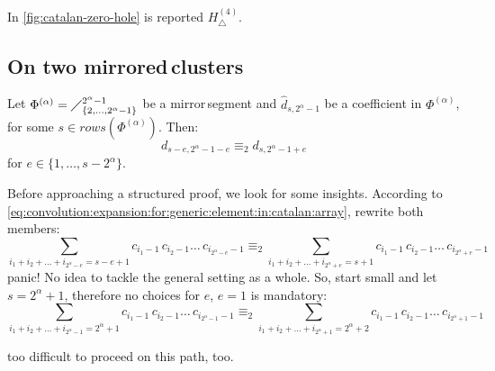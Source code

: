 
In \autoref{fig:catalan-zero-hole} is reported $H_{\bigtriangleup}^{(4)}$.

\subsection{On two \flqq mirrored\frqq\,clusters}

\begin{theorem}
    Let $\Phi^{(\alpha)}=\diagup_{\lbrace 2,\ldots,2^{\alpha}-1\rbrace}^{2^{\alpha}-1}$
    be a \flqq mirror\frqq\,segment and $\hat{d}_{s,2^{{\alpha}}-1}$ 
    be a coefficient in $\Phi^{(\alpha)}$, for some $s\in rows\left(\Phi^{(\alpha)}\right)$. Then:
    \begin{displaymath}
        d_{s-e,2^{{\alpha}}-1-e} \equiv_{2} d_{s,2^{{\alpha}}-1+e}
    \end{displaymath}
    for $e\in\lbrace1,\ldots,s-2^{{\alpha}}\rbrace$.
    \label{thm:two:mirrored:clusters}
\end{theorem}

Before approaching a structured proof, we look for some insights.
According to \autoref{eq:convolution:expansion:for:generic:element:in:catalan:array},
rewrite both members:
\begin{displaymath}
    \sum_{i_{1}+i_{2}+\ldots+i_{2^{\alpha}-e}=s-e+1}
        {c_{i_{1}-1}\,c_{i_{2}-1}\ldots\,c_{i_{2^{\alpha}-e}-1}}
    \equiv_{2}
    \sum_{i_{1}+i_{2}+\ldots+i_{2^{\alpha}+e}=s+1}
        {c_{i_{1}-1}\,c_{i_{2}-1}\ldots\,c_{i_{2^{\alpha}+e}-1}}
\end{displaymath}
panic! No idea to tackle the general setting as a whole. So, start small and
let $s=2^{{\alpha}}+1$, therefore no choices for $e$, $e=1$ is mandatory:
\begin{displaymath}
    \sum_{i_{1}+i_{2}+\ldots+i_{2^{\alpha}-1}=2^{{\alpha}}+1}
        {c_{i_{1}-1}\,c_{i_{2}-1}\ldots\,c_{i_{2^{\alpha}-1}-1}}
    \equiv_{2}
    \sum_{i_{1}+i_{2}+\ldots+i_{2^{\alpha}+1}=2^{{\alpha}}+2}
        {c_{i_{1}-1}\,c_{i_{2}-1}\ldots\,c_{i_{2^{\alpha}+1}-1}}
\end{displaymath}

too difficult to proceed on this path, too. 

